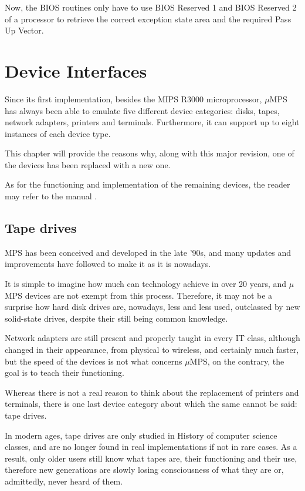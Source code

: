 \documentclass[12pt,a4paper,openright,twoside]{report}
\begin{document}
Now, the BIOS routines only have to use BIOS Reserved 1 and BIOS Reserved 2 of a processor to retrieve the correct exception state area and the required Pass Up Vector.

\chapter{Device Interfaces}
\lhead[\fancyplain{}{\bfseries\thepage}]{\fancyplain{}{\bfseries\rightmark}}
Since its first implementation, besides the MIPS R3000 microprocessor, $\mu$MPS has always been able to emulate five different device categories: disks, tapes, network adapters, printers and terminals.
Furthermore, it can support up to eight instances of each device type.

This chapter will provide the reasons why, along with this major revision, one of the devices has been replaced with a new one.

As for the functioning and implementation of the remaining devices, the reader may refer to the manual \cite{pops}.

\section{Tape drives}
MPS has been conceived and developed in the late '90s, and many updates and improvements have followed to make it as it is nowadays.

It is simple to imagine how much can technology achieve in over 20 years, and $\mu$MPS devices are not exempt from this process.
Therefore, it may not be a surprise how hard disk drives are, nowadays, less and less used, outclassed by new solid-state drives, despite their still being common knowledge.

Network adapters are still present and properly taught in every IT class, although changed in their appearance, from physical to wireless, and certainly much faster, but the speed of the devices is not what concerns $\mu$MPS, on the contrary, the goal is to teach their functioning.

Whereas there is not a real reason to think about the replacement of printers and terminals, there is one last device category about which the same cannot be said: tape drives.

In modern ages, tape drives are only studied in History of computer science classes, and are no longer found in real implementations if not in rare cases.
As a result, only older users still know what tapes are, their functioning and their use, therefore new generations are slowly losing consciousness of what they are or, admittedly, never heard of them.
\end{document}

